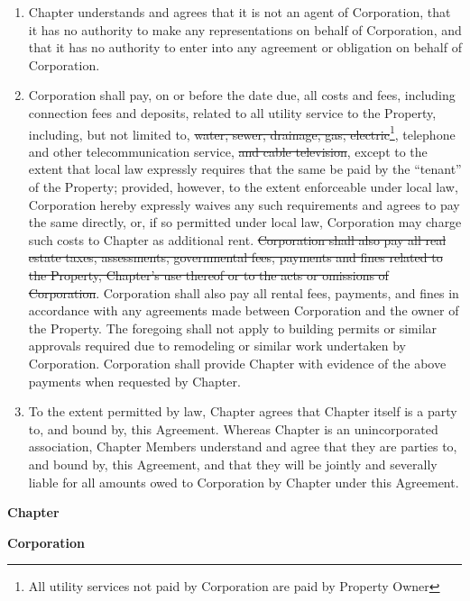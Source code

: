 \documentclass[12pt]{article}
\begin{document}
\begin{enumerate}
        \item Chapter understands and agrees that it is not an agent of Corporation, that it has no authority to make any representations on behalf of Corporation, and that it has no authority to enter into any agreement or obligation on behalf of Corporation.

        \item Corporation shall pay, on or before the date due, all costs and fees, including connection fees and deposits, related to all utility service to the Property, including, but not limited to, \st{water, sewer, drainage, gas, electric}\footnote{All utility services not paid by Corporation are paid by Property Owner}, telephone and other telecommunication service, \st{and cable television}, except to the extent that local law expressly requires that the same be paid by the ``tenant'' of the Property; provided, however, to the extent enforceable under local law, Corporation hereby expressly waives any such requirements and agrees to pay the same directly, or, if so permitted under local law, Corporation may charge such costs to Chapter as additional rent.
                \st{Corporation shall also pay all real estate taxes, assessments, governmental fees, payments and fines related to the Property, Chapter's use thereof or to the acts or omissions of Corporation}.
                Corporation shall also pay all rental fees, payments, and fines in accordance with any agreements made between Corporation and the owner of the Property.
                The foregoing shall not apply to building permits or similar approvals required due to remodeling or similar work undertaken by Corporation. Corporation shall provide Chapter with evidence of the above payments when requested by Chapter.
        \item To the extent permitted by law, Chapter agrees that Chapter itself is a party to, and bound by, this Agreement. Whereas Chapter is an unincorporated association, Chapter Members understand and agree that they are parties to, and bound by, this Agreement, and that they will be jointly and severally liable for all amounts owed to Corporation by Chapter under this Agreement.
\end{enumerate}

\clearpage
\textbf{\large Chapter}

\signature{President}

\signature{Risk Manager}

\signature{House Manager}

\clearpage
\textbf{\large Corporation}

\signature{President}
\end{document}
